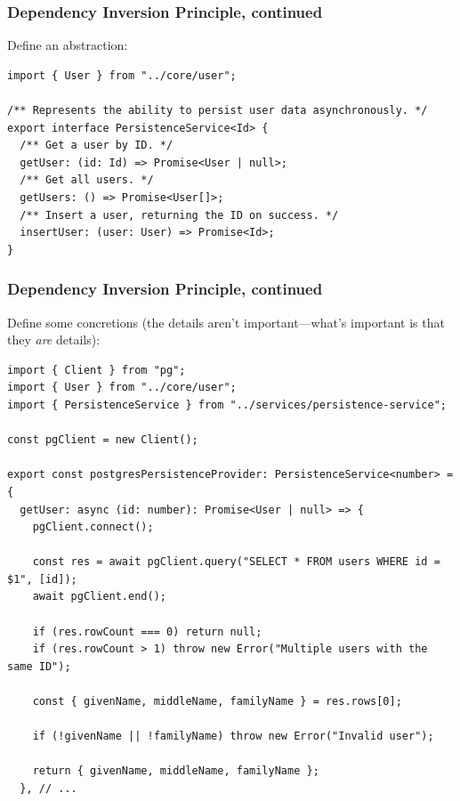 \documentclass[aspectratio=169]{beamer}
\begin{document}
\begin{frame}[fragile]
  \frametitle{Dependency Inversion Principle, continued}
  Define an abstraction:

  \vspace{1em}

  \begin{verbatim}
import { User } from "../core/user";

/** Represents the ability to persist user data asynchronously. */
export interface PersistenceService<Id> {
  /** Get a user by ID. */
  getUser: (id: Id) => Promise<User | null>;
  /** Get all users. */
  getUsers: () => Promise<User[]>;
  /** Insert a user, returning the ID on success. */
  insertUser: (user: User) => Promise<Id>;
}
\end{verbatim}
\end{frame}

\begin{frame}[fragile]
  \frametitle{Dependency Inversion Principle, continued}
  Define some concretions (the details aren't important---what's important is
  that they \emph{are} details):

  \vspace{1em}

  \begin{verbatim}
import { Client } from "pg";
import { User } from "../core/user";
import { PersistenceService } from "../services/persistence-service";

const pgClient = new Client();

export const postgresPersistenceProvider: PersistenceService<number> = {
  getUser: async (id: number): Promise<User | null> => {
    pgClient.connect();

    const res = await pgClient.query("SELECT * FROM users WHERE id = $1", [id]);
    await pgClient.end();

    if (res.rowCount === 0) return null;
    if (res.rowCount > 1) throw new Error("Multiple users with the same ID");

    const { givenName, middleName, familyName } = res.rows[0];

    if (!givenName || !familyName) throw new Error("Invalid user");

    return { givenName, middleName, familyName };
  }, // ...
  \end{verbatim}
\end{frame}
\end{document}
